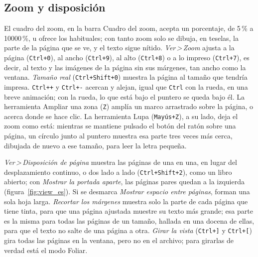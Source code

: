 \documentclass[12pt,
              article,
              oneside
              ]{memoir}
\newcommand*{\menu}[1]{\textit{#1}}
\newcommand*{\then}{\,>\,}
\newcommand*{\key}[1]{\texttt{#1}}
\begin{document}
\subsection{Zoom y disposición}

%
El cuadro del zoom, en la barra Cuadro del zoom, acepta un porcentaje, de
5\,\% a 10000\,\%, u ofrece los habituales; con tanto zoom solo se dibuja,
en teselas, la parte de la página que se ve, y el texto sigue nítido. \menu{Ver\then Zoom} ajusta a la página (\key{Ctrl+0}), al
ancho (\key{Ctrl+9}), al alto (\key{Ctrl+8}) o a lo impreso
(\key{Ctrl+7}), es decir, al texto y las imágenes de la página sin sus
márgenes, tan ancho como la ventana. \menu{Tamaño real}
(\key{Ctrl+Shift+0}) muestra la página al tamaño que tendría impresa.
\key{Ctrl++} y \key{Ctrl+-} acercan y alejan, igual que \key{Ctrl} con la
rueda, en una breve animación; con la rueda, lo que está bajo el puntero
se queda bajo él. La herramienta Ampliar una zona (\key{Z}) amplía un marco arrastrado
sobre la página, o acerca donde se hace clic. La herramienta Lupa
(\key{Mayús+Z}), a su lado, deja el zoom como está: mientras se mantiene
pulsado el botón del ratón sobre una página, un círculo junto al puntero
muestra esa parte tres veces más cerca, dibujada de nuevo a ese tamaño,
para leer la letra pequeña.

%
\menu{Ver\then Disposición de página} muestra las páginas de una en una, en
lugar del desplazamiento continuo, o dos lado a lado (\key{Ctrl+Shift+2}),
como un libro abierto; con \menu{Mostrar la portada aparte}, las
páginas pares quedan a la izquierda (figura~\ref{fig:view_es}). Si se
desmarca \menu{Mostrar espacio entre páginas}, forman una sola hoja larga.
\menu{Recortar los márgenes} muestra solo la parte de cada página que tiene
tinta, para que una página ajustada muestre su texto más grande; esa parte
es la misma para todas las páginas de un tamaño, hallada en una docena de
ellas, para que el texto no salte de una página a otra.
\menu{Girar la vista} (\key{Ctrl+]} y \key{Ctrl+[}) gira todas las páginas
en la ventana, pero no en el archivo; para girarlas de verdad está el modo
Foliar.
\end{document}
